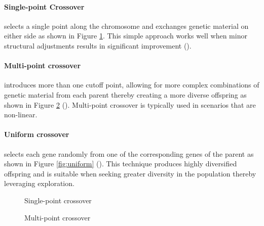 \parbreak\noindent \paragraph{Single-point Crossover} selects a single point along the chromosome and exchanges genetic material on either side as shown in Figure \ref{fig:singlepoint}. This simple approach works well when minor structural adjustments results in significant improvement (\cite{intelligentOptimization}).

\parbreak\noindent \paragraph{Multi-point crossover} introduces more than one cutoff point, allowing for more complex combinations of genetic material from each parent thereby creating a more diverse offspring as shown in Figure \ref{fig:multipoint} (\cite{crossoverMethods}). Multi-point crossover is typically used in scenarios that are non-linear. 

\parbreak\noindent \paragraph{Uniform crossover} selects each gene randomly from one of the corresponding genes of the parent as shown in Figure \ref{fig:uniform} (\cite{crossoverMethods}). This technique produces highly diversified offspring and is suitable when seeking greater diversity in the population thereby leveraging exploration.

\parbreak
\begin{figure}[H] %
	\centering %
	\caption{Single-point crossover}
	\label{fig:singlepoint} %
\end{figure}

\parbreak
\begin{figure}[H] %
	\centering %
	\caption{Multi-point crossover}
	\label{fig:multipoint} %
\end{figure}

